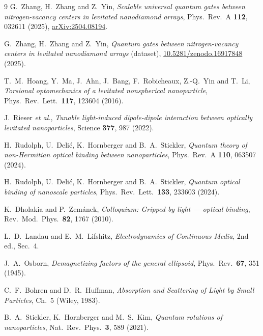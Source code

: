 \documentclass[11pt,a4paper]{article}
\begin{document}
\begin{thebibliography}{9}
 G.~Zhang, H.~Zhang and Z.~Yin,
\emph{Scalable universal quantum gates between nitrogen-vacancy centers in
levitated nanodiamond arrays}, Phys.\ Rev.\ A \textbf{112}, 032611 (2025),
\href{https://arxiv.org/abs/2504.08194}{arXiv:2504.08194}.

 G.~Zhang, H.~Zhang and Z.~Yin, \emph{Quantum gates between
nitrogen-vacancy centers in levitated nanodiamond arrays} (dataset),
\href{https://doi.org/10.5281/zenodo.16917848}{10.5281/zenodo.16917848} (2025).

 T.~M.~Hoang, Y.~Ma, J.~Ahn, J.~Bang, F.~Robicheaux,
Z.-Q.~Yin and T.~Li, \emph{Torsional optomechanics of a levitated nonspherical
nanoparticle}, Phys.\ Rev.\ Lett.\ \textbf{117}, 123604 (2016).

 J.~Rieser \emph{et al.}, \emph{Tunable light-induced
dipole-dipole interaction between optically levitated nanoparticles},
Science \textbf{377}, 987 (2022).

 H.~Rudolph, U.~Deli\'c, K.~Hornberger and B.~A.~Stickler,
\emph{Quantum theory of non-Hermitian optical binding between nanoparticles},
Phys.\ Rev.\ A \textbf{110}, 063507 (2024).

 H.~Rudolph, U.~Deli\'c, K.~Hornberger and
B.~A.~Stickler, \emph{Quantum optical binding of nanoscale particles},
Phys.\ Rev.\ Lett.\ \textbf{133}, 233603 (2024).

 K.~Dholakia and P.~Zem\'anek, \emph{Colloquium: Gripped by
light --- optical binding}, Rev.\ Mod.\ Phys.\ \textbf{82}, 1767 (2010).

 L.~D.~Landau and E.~M.~Lifshitz,
\emph{Electrodynamics of Continuous Media}, 2nd ed., Sec.~4.

 J.~A.~Osborn, \emph{Demagnetizing factors of the general
ellipsoid}, Phys.\ Rev.\ \textbf{67}, 351 (1945).

 C.~F.~Bohren and D.~R.~Huffman, \emph{Absorption and Scattering of
Light by Small Particles}, Ch.~5 (Wiley, 1983).

 B.~A.~Stickler, K.~Hornberger and M.~S.~Kim,
\emph{Quantum rotations of nanoparticles}, Nat.\ Rev.\ Phys.\ \textbf{3}, 589
(2021).
\end{thebibliography}
\end{document}
